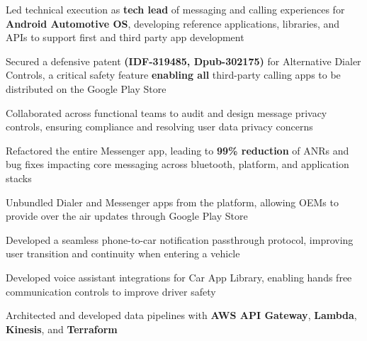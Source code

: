\documentclass[]{peter_resume}
\begin{document}
\begin{minipage}{\textwidth}
 
\begin{tightemize}
    \item Led technical execution as \textbf{tech lead} of messaging and calling experiences for \textbf{Android Automotive OS}, developing reference applications, libraries, and APIs to support first and third party app development
    \item Secured a defensive patent \textbf{(IDF-319485, Dpub-302175)} for Alternative Dialer Controls, a critical safety feature \textbf{enabling all} third-party calling apps to be distributed on the Google Play Store
    \item Collaborated across functional teams to audit and design message privacy controls, ensuring compliance and resolving user data privacy concerns
    \item Refactored the entire Messenger app, leading to \textbf{99\% reduction} of ANRs and bug fixes impacting core messaging across bluetooth, platform, and application stacks
    \item Unbundled Dialer and Messenger apps from the platform, allowing OEMs to provide over the air updates through Google Play Store
    \item Developed a seamless phone-to-car notification passthrough protocol, improving user transition and continuity when entering a vehicle
    \item Developed voice assistant integrations for Car App Library, enabling hands free communication controls to improve driver safety
\end{tightemize}
\sectionsep

 
\begin{tightemize}
    \item Architected and developed data pipelines with \textbf{AWS API Gateway}, \textbf{Lambda}, \textbf{Kinesis}, and \textbf{Terraform} %
\end{tightemize}
\sectionsep



\end{minipage}
\end{document}
